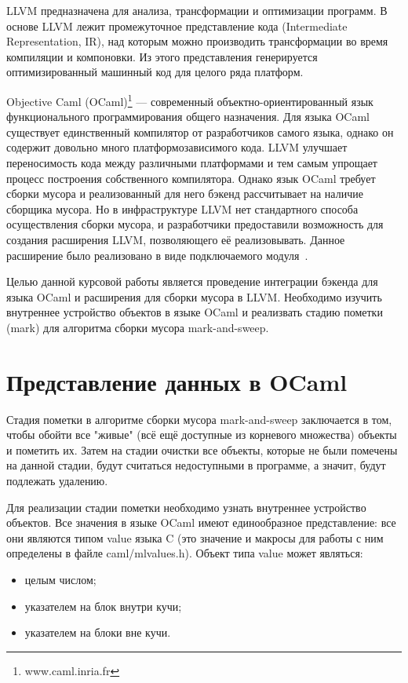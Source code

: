 LLVM предназначена 
для анализа, трансформации и оптимизации программ. В основе LLVM лежит промежуточное представление кода 
(Intermediate Representation, IR), над которым можно производить трансформации во время компиляции и компоновки. 
Из этого представления генерируется оптимизированный машинный код для целого ряда платформ.

Objective Caml (OCaml)\footnote{www.caml.inria.fr} --- современный объектно-ориентированный язык функционального программирования общего назначения.
Для языка OCaml существует единственный компилятор от разработчиков самого языка, однако он содержит довольно много платформозависимого кода.
LLVM улучшает переносимость кода между различными платформами и тем самым упрощает процесс построения 
собственного компилятора. Однако язык OCaml требует сборки мусора и реализованный для него бэкенд рассчитывает на наличие сборщика мусора. Но в 
инфраструктуре LLVM нет стандартного способа осуществления сборки мусора, и разработчики предоставили 
возможность для создания расширения LLVM, позволяющего её реализовывать. Данное расширение было реализовано в виде подключаемого модуля~\cite{samofal}.

Целью данной курсовой работы является проведение интеграции бэкенда для языка OCaml и расширения для сборки мусора в LLVM. Необходимо изучить внутреннее 
устройство объектов в языке OCaml и реализвать стадию пометки (mark) для алгоритма сборки мусора mark-and-sweep.

\section{Представление данных в OCaml}

Стадия пометки в алгоритме сборки мусора mark-and-sweep заключается в том, чтобы обойти все "живые" (всё ещё доступные из корневого множества)
объекты и пометить их. Затем на стадии очистки все объекты, которые не были помечены на данной стадии, будут считаться недоступными в программе, а значит,
будут подлежать удалению.

Для реализации стадии пометки необходимо узнать внутреннее устройство объектов.
Все значения в языке OCaml имеют единообразное представление: все они являются типом value языка C (это значение и макросы для работы с ним
определены в файле caml/mlvalues.h). Объект типа value может являться:

\begin{itemize}
   \item целым числом;
   \item указателем на блок внутри кучи;
   \item указателем на блоки вне кучи.
\end{itemize}

